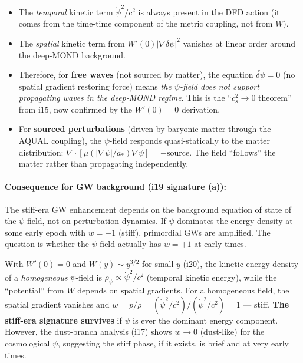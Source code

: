 \documentclass[11pt]{article}
\newcommand{\astar}{a_*}
\begin{document}
\begin{itemize}
\item The \emph{temporal} kinetic term $\dot\psi^2/c^2$ is always
  present in the DFD action (it comes from the time-time component
  of the metric coupling, not from $W$).

\item The \emph{spatial} kinetic term from $W'(0)|\nabla\delta\psi|^2$
  vanishes at linear order around the deep-MOND background.

\item Therefore, for \textbf{free waves} (not sourced by matter), the
  equation $\ddot{\delta\psi} = 0$ (no spatial gradient restoring force)
  means \emph{the $\psi$-field does not support propagating waves in the
  deep-MOND regime}.  This is the ``$c_s^2 \to 0$ theorem'' from i15,
  now confirmed by the $W'(0)=0$ derivation.

\item For \textbf{sourced perturbations} (driven by baryonic matter
  through the AQUAL coupling), the $\psi$-field responds quasi-statically
  to the matter distribution: $\nabla\cdot[\mu(|\nabla\psi|/\astar)\nabla\psi]
  = -\text{source}$.  The field ``follows'' the matter rather than
  propagating independently.
\end{itemize}

\paragraph{Consequence for GW background (i19 signature (a)):}
The stiff-era GW enhancement depends on the background equation of state
of the $\psi$-field, not on perturbation dynamics.  If $\psi$ dominates
the energy density at some early epoch with $w = +1$ (stiff), primordial
GWs are amplified.  The question is whether the $\psi$-field actually
has $w = +1$ at early times.

With $W'(0) = 0$ and $W(y) \sim y^{3/2}$ for small $y$ (i20), the
kinetic energy density of a \emph{homogeneous} $\psi$-field is
$\rho_\psi \propto \dot\psi^2/c^2$ (temporal kinetic energy), while
the ``potential'' from $W$ depends on spatial gradients.  For a
homogeneous field, the spatial gradient vanishes and
$w = p/\rho = (\dot\psi^2/c^2)/(\dot\psi^2/c^2) = 1$ --- stiff.
\textbf{The stiff-era signature survives} if $\psi$ is ever the
dominant energy component.  However, the dust-branch analysis (i17)
shows $w \to 0$ (dust-like) for the cosmological $\psi$, suggesting
the stiff phase, if it exists, is brief and at very early times.
\end{document}
